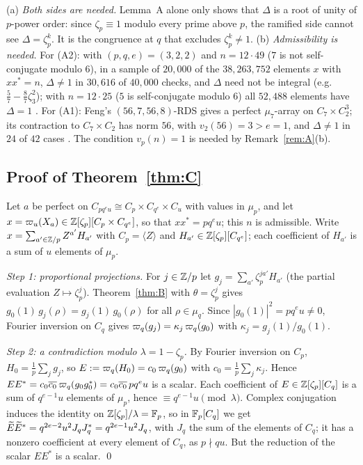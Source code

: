 \begin{remark}\label{rem:B}
(a) \emph{Both sides are needed.} Lemma~A alone only shows that $\Delta$
is a root of unity of $p$-power order: since $\zeta_p\equiv1$ modulo every
prime above $p$, the ramified side cannot see $\Delta=\zeta_p^k$. It is
the congruence at $q$ that excludes $\zeta_p^k\ne1$.
(b) \emph{Admissibility is needed.} For (A2): with $(p,q,e)=(3,2,2)$ and
$n=12\cdot49$ ($7$ is not self-conjugate modulo $6$), in a sample of
$20{,}000$ of the $38{,}263{,}752$ elements $x$ with $xx^*=n$, $\Delta\ne1$
in $30{,}616$ of $40{,}000$ checks, and $\Delta$ need not be integral (e.g.\
$\frac57-\frac87\zeta_3^2$); with $n=12\cdot25$ ($5$ is self-conjugate
modulo $6$) all $52{,}488$ elements have $\Delta=1$ \deptag{Comp}. For
(A1): Feng's $(56,7,56,8)$-RDS \cite[Thm.~9]{Feng2009} gives a perfect
$\mu_7$-array on $C_7\times C_2^3$; its contraction to $C_7\times C_2$
has norm $56$, with $v_2(56)=3>e=1$, and $\Delta\ne1$ in $24$ of $42$
cases \deptag{Comp}. The condition $v_p(n)=1$ is needed by
Remark~\ref{rem:A}(b).
\end{remark}

\subsection{Proof of Theorem~\ref{thm:C}}\label{ssec:proofC}
Let $a$ be perfect on $C_{pq^eu}\cong C_p\times C_{q^e}\times C_u$ with
values in $\mu_p$, and let $x=\varpi_u(X_a)\in\mathbb{Z}[\zeta_p][C_p\times
C_{q^e}]$, so that $xx^*=pq^eu$; this $n$ is admissible. Write
$x=\sum_{a'\in\mathbb{Z}/p}Z^{a'}H_{a'}$ with $C_p=\langle Z\rangle$ and
$H_{a'}\in\mathbb{Z}[\zeta_p][C_{q^e}]$; each coefficient of $H_{a'}$ is a sum of
$u$ elements of $\mu_p$.

\emph{Step 1: proportional projections.} For $j\in\mathbb{Z}/p$ let
$g_j=\sum_{a'}\zeta_p^{ja'}H_{a'}$ (the partial evaluation
$Z\mapsto\zeta_p^j$). Theorem~\ref{thm:B} with $\theta=\zeta_p^j$ gives
$g_0(1)\,g_j(\rho)=g_j(1)\,g_0(\rho)$ for all $\rho\in\mu_q$. Since
$|g_0(1)|^2=pq^eu\ne0$, Fourier inversion on $C_q$ gives
$\varpi_q(g_j)=\kappa_j\,\varpi_q(g_0)$ with $\kappa_j=g_j(1)/g_0(1)$.

\emph{Step 2: a contradiction modulo $\lambda=1-\zeta_p$.} By Fourier
inversion on $C_p$, $H_0=\frac1p\sum_jg_j$, so
$E:=\varpi_q(H_0)=c_0\,\varpi_q(g_0)$ with $c_0=\frac1p\sum_j\kappa_j$. Hence
$EE^*=c_0\overline{c_0}\,\varpi_q(g_0g_0^*)=c_0\overline{c_0}\,pq^eu$ is a scalar.
Each coefficient of $E\in\mathbb{Z}[\zeta_p][C_q]$ is a sum of $q^{e-1}u$
elements of $\mu_p$, hence $\equiv q^{e-1}u\pmod\lambda$. Complex
conjugation induces the identity on $\mathbb{Z}[\zeta_p]/\lambda=\mathbb{F}_p$, so in
$\mathbb{F}_p[C_q]$ we get $\widetilde{E}\widetilde{E}^*=q^{2e-2}u^2J_qJ_q^*=q^{2e-1}u^2J_q$,
with $J_q$ the sum of the elements of $C_q$; it has a nonzero
coefficient at every element of $C_q$, as $p\nmid qu$. But the reduction
of the scalar $EE^*$ is a scalar. \qed

